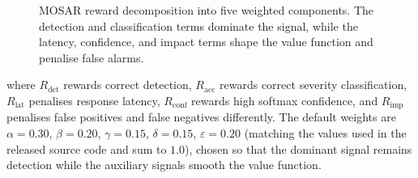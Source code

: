\documentclass[ai,article,submit,moreauthors,pdftex]{Definitions/mdpi}
\newcommand{\rev}[1]{#1}
\begin{document}
\begin{figure}[!htbp]
  \centering
  \caption{MOSAR reward decomposition into five weighted components.
  The detection and classification terms dominate the signal, while the
  latency, confidence, and impact terms shape the value function and
  penalise false alarms.}
  \label{fig:mosar_schema}
\end{figure}

where $R_{\text{det}}$ rewards correct detection, $R_{\text{acc}}$
rewards correct severity classification, $R_{\text{lat}}$ penalises
response latency, $R_{\text{conf}}$ rewards high softmax confidence, and
$R_{\text{imp}}$ penalises false positives and false negatives
differently. \rev{The default weights are $\alpha = 0.30$, $\beta = 0.20$,
$\gamma = 0.15$, $\delta = 0.15$, $\varepsilon = 0.20$ (matching the values used in the released source code and sum to $1.0$), chosen so that}
the dominant signal remains detection while the auxiliary signals smooth
the value function.
\end{document}
